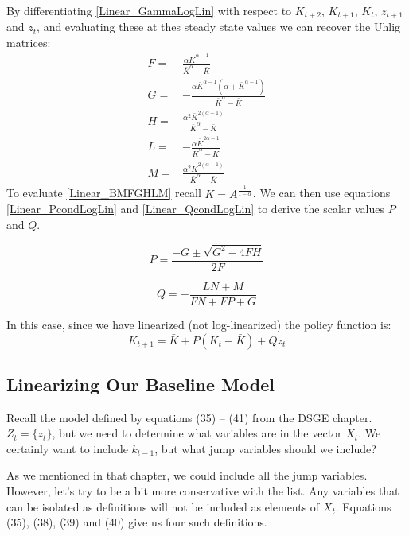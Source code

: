 \documentclass[letterpaper,12pt]{article}
\theoremstyle{definition}
\begin{document}
\begin{spacing}{1.5}
		By differentiating \eqref{Linear_GammaLogLin} with respect to $K_{t+2}$, $K_{t+1}$, $K_t$, $z_{t+1}$ and $z_t$, and evaluating these at thes steady state values we can recover the Uhlig matrices:
		\begin{equation}\label{Linear_BMFGHLM}
		\begin{split}
		F = & \frac{\alpha \bar K^{\alpha-1}}{\bar K^\alpha - \bar K} \\ \nonumber
		G = & - \frac{\alpha \bar K^{\alpha-1}(\alpha + \bar K^{\alpha-1})}{\bar K^\alpha - \bar K} \\
		H = & \frac{\alpha^2 \bar K^{2(\alpha-1)}}{\bar K^\alpha - \bar K} \\
		L = & - \frac{\alpha \bar K^{2\alpha-1}}{\bar K^\alpha - \bar K} \\
		M = & \frac{\alpha^2 \bar K^{2(\alpha-1)}}{\bar K^\alpha - \bar K}
		\end{split}
		\end{equation}
		To evaluate \eqref{Linear_BMFGHLM} recall $\bar K =  A ^\frac{1}{1-\alpha}$.  We can then use equations \eqref{Linear_PcondLogLin} and \eqref{Linear_QcondLogLin} to derive the scalar values $P$ and $Q$.

		\begin{equation} \label{Linear_BMP}
		P = \frac {-G \pm \sqrt {G^2 - 4FH}}{2F}
		\end{equation}

		\begin{equation}\label{Linear_BMQ}
		Q  = -\frac{LN+M}{FN+FP+G}
		\end{equation}

		In this case, since we have linearized (not log-linearized) the policy function is:
		\begin{equation}\label{Linear_BMPolicy}
		K_{t+1} = \bar K + P (K_t-\bar K) + Q z_t
		\end{equation}


	\subsection{Linearizing Our Baseline Model}\label{Linear_LogLinDSGE}
		Recall the model defined by equations (35) -- (41) from the DSGE chapter. $Z_t = \{z_t\}$, but we need to determine what variables are in the vector $X_t$. We certainly want to include $k_{t-1}$, but what jump variables should we include?

		As we mentioned in that chapter, we could include all the jump variables. However, let's try to be a bit more conservative with the list. Any variables that can be isolated as definitions will not be included as elements of $X_t$. Equations (35), (38), (39) and (40) give us four such definitions.


\end{spacing}
\end{document}
